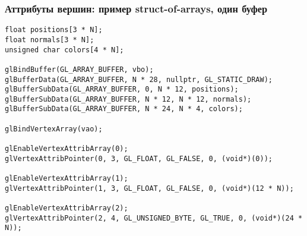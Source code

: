 \documentclass[10pt]{beamer}
\begin{document}
\begin{frame}[fragile]
\frametitle{Аттрибуты вершин: пример struct-of-arrays, один буфер}
\begin{verbatim}
float positions[3 * N];
float normals[3 * N];
unsigned char colors[4 * N];

glBindBuffer(GL_ARRAY_BUFFER, vbo);
glBufferData(GL_ARRAY_BUFFER, N * 28, nullptr, GL_STATIC_DRAW);
glBufferSubData(GL_ARRAY_BUFFER, 0, N * 12, positions);
glBufferSubData(GL_ARRAY_BUFFER, N * 12, N * 12, normals);
glBufferSubData(GL_ARRAY_BUFFER, N * 24, N * 4, colors);

glBindVertexArray(vao);

glEnableVertexAttribArray(0);
glVertexAttribPointer(0, 3, GL_FLOAT, GL_FALSE, 0, (void*)(0));

glEnableVertexAttribArray(1);
glVertexAttribPointer(1, 3, GL_FLOAT, GL_FALSE, 0, (void*)(12 * N));
    
glEnableVertexAttribArray(2);
glVertexAttribPointer(2, 4, GL_UNSIGNED_BYTE, GL_TRUE, 0, (void*)(24 * N));
\end{verbatim}
\vspace*{-1cm}
\begin{center}
\end{center}
\end{frame}
\end{document}
